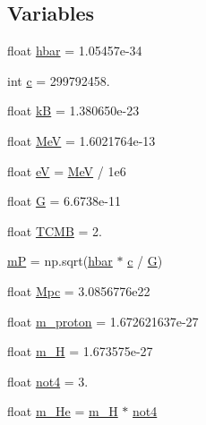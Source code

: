 \subsection*{Variables}
\begin{DoxyCompactItemize}
\item 
float \mbox{\hyperlink{namespacecamb_1_1bbn_a5b708814b666163b312ae9d46c458a40}{hbar}} = 1.\+05457e-\/34
\item 
int \mbox{\hyperlink{namespacecamb_1_1bbn_a679cc6941c03606fb81846de0595bbf0}{c}} = 299792458.
\item 
float \mbox{\hyperlink{namespacecamb_1_1bbn_acf1e58cf8bb0a963cdea5d6d5c8a7965}{kB}} = 1.\+380650e-\/23
\item 
float \mbox{\hyperlink{namespacecamb_1_1bbn_ab7d9516327d53209dc68ed04b575b942}{MeV}} = 1.\+6021764e-\/13
\item 
float \mbox{\hyperlink{namespacecamb_1_1bbn_adb3c70534be507b9680c975ad6c2ada1}{eV}} = \mbox{\hyperlink{namespacecamb_1_1bbn_ab7d9516327d53209dc68ed04b575b942}{MeV}} / 1e6
\item 
float \mbox{\hyperlink{namespacecamb_1_1bbn_a516a8888d6d387c64db5a92882e60839}{G}} = 6.\+6738e-\/11
\item 
float \mbox{\hyperlink{namespacecamb_1_1bbn_ada23f3dc20ced1c849a9c6885f34db92}{T\+C\+MB}} = 2.
\item 
\mbox{\hyperlink{namespacecamb_1_1bbn_a96c42bdaca47fcfad93e6567839f017b}{mP}} = np.\+sqrt(\mbox{\hyperlink{namespacecamb_1_1bbn_a5b708814b666163b312ae9d46c458a40}{hbar}} $\ast$ \mbox{\hyperlink{namespacecamb_1_1bbn_a679cc6941c03606fb81846de0595bbf0}{c}} / \mbox{\hyperlink{namespacecamb_1_1bbn_a516a8888d6d387c64db5a92882e60839}{G}})
\item 
float \mbox{\hyperlink{namespacecamb_1_1bbn_ad4577440de870759161fbb421dcfe786}{Mpc}} = 3.\+0856776e22
\item 
float \mbox{\hyperlink{namespacecamb_1_1bbn_a91eae46cae8d4e10d04c05b5f8324278}{m\+\_\+proton}} = 1.\+672621637e-\/27
\item 
float \mbox{\hyperlink{namespacecamb_1_1bbn_aa3780f95e3d1ace78bfe399ae081a621}{m\+\_\+H}} = 1.\+673575e-\/27
\item 
float \mbox{\hyperlink{namespacecamb_1_1bbn_a55010dc4504208bd6bf60957271700c4}{not4}} = 3.
\item 
float \mbox{\hyperlink{namespacecamb_1_1bbn_addcae6f33c5419e66f9ae3006383c347}{m\+\_\+\+He}} = \mbox{\hyperlink{namespacecamb_1_1bbn_aa3780f95e3d1ace78bfe399ae081a621}{m\+\_\+H}} $\ast$ \mbox{\hyperlink{namespacecamb_1_1bbn_a55010dc4504208bd6bf60957271700c4}{not4}}

\end{DoxyCompactItemize}
